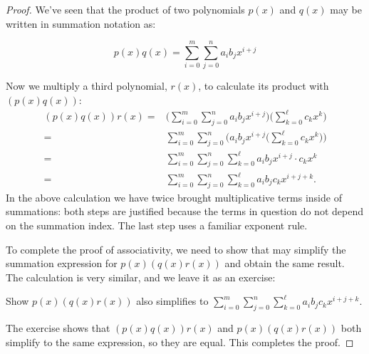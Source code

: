 \begin{proof}{} We've seen that the product of two polynomials $p(x)$ and $q(x)$ may be written in summation notation as:

\[
p(x) q(x) =\sum_{i=0}^{m}\sum_{j=0}^{n}a_i b_j x^{i+j}
\]

Now we multiply a third polynomial, $r(x)$, to calculate its product with $(p(x)q(x))$:
\begin{align*}
(p(x) q(x))r(x) =&  \Big( \sum_{i=0}^{m}\sum_{j=0}^{n}a_i b_j x^{i+j} \Big)\Big(\sum_{k=0}^{\ell} c_k x^k \Big)  \\
=&   \sum_{i=0}^{m}\sum_{j=0}^{n} \Big(a_i b_j x^{i+j}\Big(\sum_{k=0}^{\ell} c_k x^k \Big) \Big)  \\
=& \sum_{i=0}^{m}\sum_{j=0}^{n}\sum_{k=0}^{\ell} a_i b_j x^{i+j} \cdot c_k x^k \\
=&  \sum_{i=0}^{m}\sum_{j=0}^{n}\sum_{k=0}^{\ell} a_i b_j  c_k x^{i+j+k}. 
\end{align*}
In the above calculation we have twice brought multiplicative terms inside of summations: both steps are justified because the terms in question do not depend on the summation index.  The last step uses a familiar exponent rule.

To complete the proof of associativity, we need to show that may simplify the summation expression for  $p(x) (q(x)r(x))$ and obtain the same result. 
The calculation is very similar, and we leave it as an exercise:

\begin{exercise}{}
Show $p(x) (q(x)r(x))$ also simplifies to  $\displaystyle{\sum_{i=0}^{m}\sum_{j=0}^{n}\sum_{k=0}^{\ell} a_i b_j  c_k x^{i+j+k}}$.
\end{exercise}
The exercise shows that $(p(x) q(x)) r(x)$ and  $p(x) (q(x) r(x))$ both simplify to the same expression, so they are equal. This completes the proof.
\end {proof}

